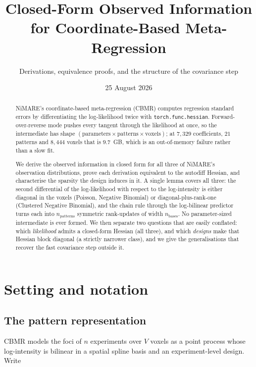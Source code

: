 \documentclass[11pt,a4paper]{article}
\title{Closed-Form Observed Information for Coordinate-Based Meta-Regression}
\author{Derivations, equivalence proofs, and the structure of the covariance step}
\date{25 August 2026}
\theoremstyle{plain}
\theoremstyle{definition}
\begin{document}
\maketitle

\begin{abstract}
NiMARE's coordinate-based meta-regression (CBMR) computes regression standard errors by
differentiating the log-likelihood twice with \texttt{torch.func.hessian}. Forward-over-reverse
mode pushes every tangent through the likelihood at once, so the intermediate has shape
$(\text{parameters} \times \text{patterns} \times \text{voxels})$; at $7{,}329$ coefficients,
$21$ patterns and $8{,}444$ voxels that is $9.7$~GB, which is an out-of-memory failure rather
than a slow fit.

We derive the observed information in closed form for all three of NiMARE's observation
distributions, prove each derivation equivalent to the autodiff Hessian, and characterise the
sparsity the design induces in it. A single lemma covers all three: the second differential of
the log-likelihood with respect to the log-intensity is either diagonal in the voxels (Poisson,
Negative Binomial) or diagonal-plus-rank-one (Clustered Negative Binomial), and the chain rule
through the log-bilinear predictor turns each into $n_{\text{patterns}}$ symmetric rank-updates
of width $n_{\text{bases}}$. No parameter-sized intermediate is ever formed. We then separate
two questions that are easily conflated: which \emph{likelihood} admits a closed-form Hessian
(all three), and which \emph{designs} make that Hessian block diagonal (a strictly narrower
class), and we give the generalisations that recover the fast covariance step outside it.
\end{abstract}

\tableofcontents

\section{Setting and notation}

\subsection{The pattern representation}

CBMR models the foci of $n$ experiments over $V$ voxels as a point process whose log-intensity
is bilinear in a spatial spline basis and an experiment-level design. Write
\end{document}
